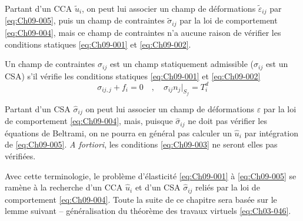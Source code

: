 Partant d'un CCA $\tilde{u}_i$, on peut lui associer un champ de déformations $\tilde{\varepsilon}_{ij}$ par \eqref{eq:Ch09-005}, puis un champ de contraintes $\tilde{\sigma}_{ij}$ par la loi de comportement \eqref{eq:Ch09-004}, mais ce champ de contraintes n'a aucune raison de vérifier les conditions statiques \eqref{eq:Ch09-001} et \eqref{eq:Ch09-002}. 

\begin{deff}
    Un champ de contraintes $\hat{\sigma}_{ij}$ est un champ statiquement admissible ($\hat{\sigma}_{ij}$ est un CSA) s'il vérifie les conditions statiques \eqref{eq:Ch09-001} et \eqref{eq:Ch09-002}
    \begin{equation}
        \sigma_{ij,j} + f_i = 0 \quad,\quad \sigma_{ij} n_j |_{S_f} = T_i^d
        \label{eq:Ch09-007}
    \end{equation}
\end{deff}

Partant d'un CSA $\hat{\sigma}_{ij}$ on peut lui associer un champ de déformations $\varepsilon$ par la loi de comportement \eqref{eq:Ch09-004}, mais, puisque $\hat{\sigma}_{ij}$ ne doit pas vérifier les équations de Beltrami, on ne pourra en général pas calculer un $\hat{u}_i$ par intégration de \eqref{eq:Ch09-005}.
\textit{A fortiori}, les conditions \eqref{eq:Ch09-003} ne seront elles pas vérifiées.

Avec cette terminologie, le problème d'élasticité \eqref{eq:Ch09-001} à \eqref{eq:Ch09-005} se ramène à la recherche d'un CCA $\hat{u}_i$ et d'un CSA $\hat{\sigma}_{ij}$ reliés par la loi de comportement \eqref{eq:Ch09-004}.
Toute la suite de ce chapitre sera basée sur le lemme suivant -- généralisation du théorème des travaux virtuels \eqref{eq:Ch03-046}.

